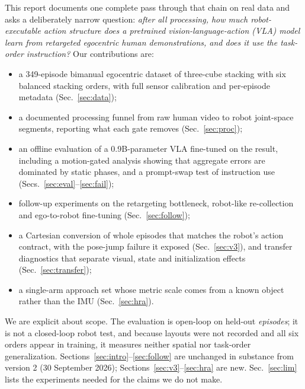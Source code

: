 \documentclass[conference,10pt]{IEEEtran}
\begin{document}
This report documents one complete pass through that chain on real data and asks a deliberately narrow question:
\emph{after all processing, how much robot-executable action structure does a pretrained vision-language-action (VLA) model
learn from retargeted egocentric human demonstrations, and does it use the task-order instruction?} Our contributions are:
\begin{itemize}
\item a 349-episode bimanual egocentric dataset of three-cube stacking with six balanced stacking orders, with full sensor
calibration and per-episode metadata (Sec.~\ref{sec:data});
\item a documented processing funnel from raw human video to robot joint-space segments, reporting what each gate removes
(Sec.~\ref{sec:proc});
\item an offline evaluation of a 0.9B-parameter VLA fine-tuned on the result, including a motion-gated analysis showing that
aggregate errors are dominated by static phases, and a prompt-swap test of instruction use (Secs.~\ref{sec:eval}--\ref{sec:fail});
\item follow-up experiments on the retargeting bottleneck, robot-like re-collection and ego-to-robot fine-tuning (Sec.~\ref{sec:follow});
\item a Cartesian conversion of whole episodes that matches the robot's action contract, with the pose-jump failure it
exposed (Sec.~\ref{sec:v3}), and transfer diagnostics that separate visual, state and initialization effects (Sec.~\ref{sec:transfer});
\item a single-arm approach set whose metric scale comes from a known object rather than the IMU (Sec.~\ref{sec:hra}).
\end{itemize}
We are explicit about scope. The evaluation is open-loop on held-out \emph{episodes}; it is not a closed-loop robot test,
and because layouts were not recorded and all six orders appear in training, it measures neither spatial nor task-order
generalization. Sections~\ref{sec:intro}--\ref{sec:follow} are unchanged in substance from version 2 (30 September 2026);
Sections~\ref{sec:v3}--\ref{sec:hra} are new. Sec.~\ref{sec:lim} lists the experiments needed for the claims we do not make.
\end{document}
